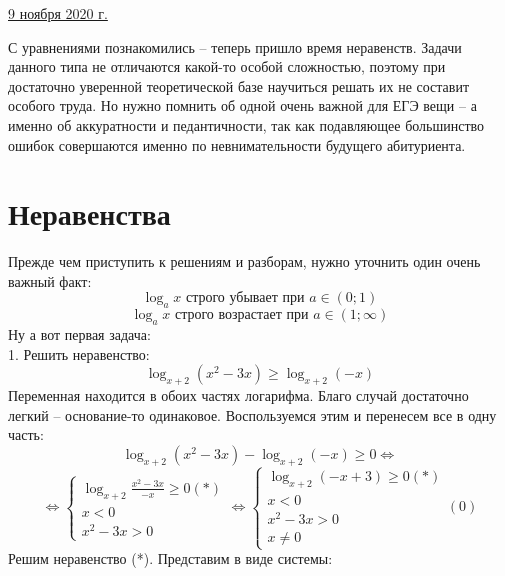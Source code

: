 \documentclass{article}
\begin{document}
\large
\begin{flushleft}
\underline{9 ноября 2020 г.}
\end{flushleft}
С уравнениями познакомились -- теперь пришло время неравенств. Задачи данного типа не отличаются
какой-то особой сложностью, поэтому при достаточно уверенной теоретической базе научиться решать
их не составит особого труда. Но нужно помнить об одной очень важной для ЕГЭ вещи --  а именно об аккуратности
и педантичности, так как подавляющее большинство ошибок совершаются именно по невнимательности
будущего абитуриента. 
\section*{Неравенства}
Прежде чем приступить к решениям и разборам, нужно уточнить один очень важный факт:
\[ \log_a x \text{ строго убывает  при } a \in (0;1)\]
\[ \log_a x \text{ строго возрастает при } a \in (1;\infty)\]
Ну а вот первая задача: \\
1. Решить неравенство:
\[ \log_{x + 2} (x^2 - 3x) \geq \log_{x + 2}(-x)\]
Переменная находится в обоих частях логарифма. Благо случай достаточно легкий -- основание-то
одинаковое. Воспользуемся этим и перенесем все в одну часть:
\[ \log_{x + 2} (x^2 - 3x) - \log_{x + 2}(-x) \geq 0 \Leftrightarrow \]
\begin{equation*}
\Leftrightarrow
    \begin{cases}
    \log_{x + 2} \frac{x^2 - 3x}{-x} \geq 0 (*)\\
    x < 0 \\
    x^2 - 3x > 0
    \end{cases}
    \Leftrightarrow
    \begin{cases}
    \log_{x + 2} (-x + 3) \geq 0 (*)\\
    x < 0 \\
    x^2 - 3x > 0 \\
    x \neq 0
    \end{cases}
    (0)
\end{equation*}
Решим неравенство (*). Представим в виде системы:
\end{document}
